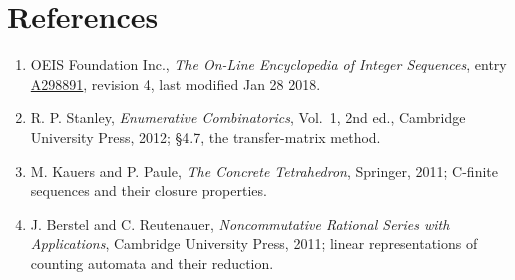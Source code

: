 \documentclass[11pt]{article}
\theoremstyle{definition}
\begin{document}
\section{References}

\begin{enumerate}

\item OEIS Foundation Inc., \emph{The On-Line Encyclopedia of Integer Sequences}, entry \href{https://oeis.org/A298891}{A298891}, revision 4, last modified Jan 28 2018.

\item R. P. Stanley, \emph{Enumerative Combinatorics}, Vol.~1, 2nd ed., Cambridge University Press, 2012; \S4.7, the transfer-matrix method.

\item M. Kauers and P. Paule, \emph{The Concrete Tetrahedron}, Springer, 2011; C-finite sequences and their closure properties.

\item J. Berstel and C. Reutenauer, \emph{Noncommutative Rational Series with Applications}, Cambridge University Press, 2011; linear representations of counting automata and their reduction.

\end{enumerate}
\end{document}
